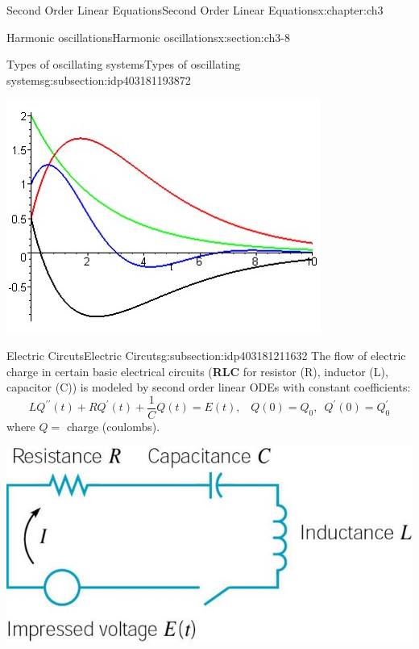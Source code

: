 \documentclass[oneside,10pt,]{book}
\newcommand{\terminology}[1]{\textbf{#1}}
\numberwithin{equation}{section}
\numberwithin{equation}{section}
\begin{document}
\begin{chapterptx}{Second Order Linear Equations}{}{Second Order Linear Equations}{}{}{x:chapter:ch3}
\begin{sectionptx}{Harmonic oscillations}{}{Harmonic oscillations}{}{}{x:section:ch3-8}
\begin{subsectionptx}{Types of oscillating systems}{}{Types of oscillating systems}{}{}{g:subsection:idp403181193872}
\begin{image}{0}{1}{0}%
\includegraphics[width=\linewidth]{images/Spring6.jpg}
\end{image}%
\end{subsectionptx}
%
%
\typeout{************************************************}
\typeout{************************************************}
%
\begin{subsectionptx}{Electric Circuts}{}{Electric Circuts}{}{}{g:subsection:idp403181211632}
The flow of electric charge in certain basic electrical circuits (\terminology{RLC} for resistor (R), inductor (L), capacitor (C)) is modeled by second order linear ODEs with constant coefficients:%
\begin{equation*}
LQ^{\prime\prime}(t)+RQ^{\prime}(t)+\frac{1}{C}Q(t)=E(t),\,\,\,\,\,Q(0)=Q_{0},\,\,\,Q^{\prime}(0)=Q_{0}^{\prime}
\end{equation*}
where \(Q=\) charge (coulombs).%
\begin{image}{0}{1}{0}%
\includegraphics[width=\linewidth]{images/Spring7.jpg}

\end{image}
\end{subsectionptx}
\end{sectionptx}
\end{chapterptx}
\end{document}
